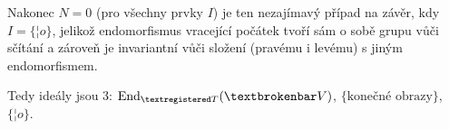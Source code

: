 \documentclass[12pt]{article}					%
\begin{document}
\begin{priklad}
\begin{reseni}
		Nakonec $N = 0$ (pro všechny prvky $I$) je ten nezajímavý případ na závěr, kdy $I = \{¦o\}$, jelikož endomorfismus vracející počátek tvoří sám o sobě grupu vůči sčítání a zároveň je invariantní vůči složení (pravému i levému) s jiným endomorfismem.

		Tedy ideály jsou 3: $\End_{®T}(¦V)$, $\{\text{konečné obrazy}\}$, $\{¦o\}$.
	\end{reseni}
\end{priklad}
\end{document}
